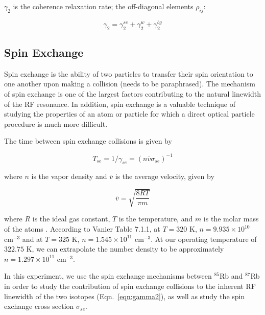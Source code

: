 $\gamma_2$ is the coherence relaxation rate; the off-diagonal elements
$\rho_{ij}$:

\begin{equation}
\gamma_2 = \gamma_2^{se} + \gamma_2^{w} + \gamma_2^{bg}
\label{eqn:gamma2}
\end{equation}

\subsection{Spin Exchange}


Spin exchange is the ability of two particles to transfer their spin
orientation to one another upon making a collision (needs to be
paraphrased)\cite {bernheim}. The mechanism of spin exchange is one of
the largest factors contributing to the natural linewidth of the RF
resonance. In addition, spin exchange is a valuable technique of
studying the properties of an atom or particle for which a direct
optical particle procedure is much more difficult.

The time between spin exchange collisions is given by

\begin{equation}
T_{se} = 1/\gamma_{se} = (n\overline{v}\sigma_{se})^{-1}
\end{equation}

where $n$ is the vapor density and $\overline{v}$ is the average velocity, given by

\begin{equation}
\overline{v} = \sqrt{\frac{8RT}{\pi m}}
\end{equation}

where $R$ is the ideal gas constant, $T$ is the temperature, and $m$
is the molar mass of the atoms \cite{vanier}. According to Vanier
Table 7.1.1, at $T = 320$ K, $n = 9.935\times 10^{10}$ cm$^{-3}$ and
at $T = 325$ K, $n = 1.545\times 10^{11}$ cm$^{-3}$. At our operating
temperature of $322.75$ K, we can extrapolate the number density to be
approximately  $n = 1.297\times 10^{11}$ cm$^{-3}$. 

In this experiment, we use the spin exchange mechanisms between
$^{85}$Rb and $^{87}$Rb in order to study the contribution of spin
exchange collisions to the inherent RF linewidth of the two isotopes
(Eqn.~\ref{eqn:gamma2}), as well as study the spin exchange cross
section $\sigma_{se}$.


